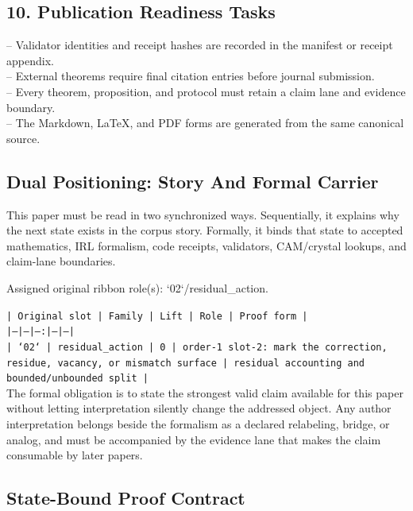 \documentclass[11pt]{article}
\begin{document}
\subsection*{10. Publication Readiness Tasks}

\noindent{}-- Validator identities and receipt hashes are recorded in the manifest or receipt appendix.\\
\noindent{}-- External theorems require final citation entries before journal submission.\\
\noindent{}-- Every theorem, proposition, and protocol must retain a claim lane and evidence boundary.\\
\noindent{}-- The Markdown, LaTeX, and PDF forms are generated from the same canonical source.\\

\subsection*{Dual Positioning: Story And Formal Carrier}

This paper must be read in two synchronized ways. Sequentially, it explains why
the next state exists in the corpus story. Formally, it binds that state to
accepted mathematics, IRL formalism, code receipts, validators, CAM/crystal
lookups, and claim-lane boundaries.

Assigned original ribbon role(s): `02`/residual\_action.

\noindent\texttt{| Original slot | Family | Lift | Role | Proof form |}\\
\noindent\texttt{|---|---|---:|---|---|}\\
\noindent\texttt{| `02` | residual\_action | 0 | order-1 slot-2: mark the correction, residue, vacancy, or mismatch surface | residual accounting and bounded/unbounded split |}\\

The formal obligation is to state the strongest valid claim available for this
paper without letting interpretation silently change the addressed object. Any
author interpretation belongs beside the formalism as a declared relabeling,
bridge, or analog, and must be accompanied by the evidence lane that makes the
claim consumable by later papers.

\subsection*{State-Bound Proof Contract}
\end{document}
